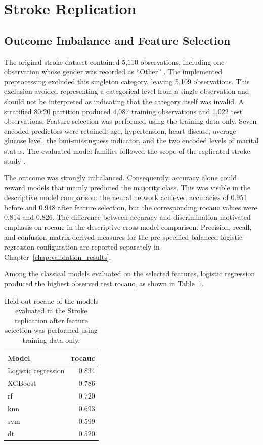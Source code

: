 \section{Stroke Replication}

\subsection{Outcome Imbalance and Feature Selection}

The original stroke dataset contained 5,110 observations, including one observation whose gender was recorded as ``Other'' \citep{wu_machine_2024}. The implemented preprocessing excluded this singleton category, leaving 5,109 observations. This exclusion avoided representing a categorical level from a single observation and should not be interpreted as indicating that the category itself was invalid. A stratified 80:20 partition produced 4,087 training observations and 1,022 test observations. Feature selection was performed using the training data only. Seven encoded predictors were retained: age, hypertension, heart disease, average glucose level, the \gls{bmi}-missingness indicator, and the two encoded levels of marital status. The evaluated model families followed the scope of the replicated stroke study \citep{wu_machine_2024}.

The outcome was strongly imbalanced. Consequently, accuracy alone could reward models that mainly predicted the majority class. This was visible in the descriptive model comparison: the neural network achieved accuracies of 0.951 before and 0.948 after feature selection, but the corresponding \gls{rocauc} values were 0.814 and 0.826. The difference between accuracy and discrimination motivated emphasis on \gls{rocauc} in the descriptive cross-model comparison. Precision, recall, and confusion-matrix-derived measures for the pre-specified
balanced logistic-regression configuration are reported separately in Chapter~\ref{chap:validation_results}.

Among the classical models evaluated on the selected features, logistic regression produced the highest observed test \gls{rocauc}, as shown in Table~\ref{tab:stroke_auc_results}.

\begin{table}[htbp]
    \centering
    \small
    \caption{Held-out \gls{rocauc} of the models evaluated in the Stroke replication after feature selection was performed using training data only.}
    \label{tab:stroke_auc_results}
    \begin{tabular}{@{}lr@{}}
        \toprule
        \textbf{Model} & \textbf{\gls{rocauc}} \\
        \midrule
        Logistic regression & 0.834 \\
        XGBoost & 0.786 \\
        \Gls{rf} & 0.720 \\
        \Gls{knn} & 0.693 \\
        \gls{svm} & 0.599 \\
        \Gls{dt} & 0.520 \\
        \bottomrule
    \end{tabular}
\end{table}

